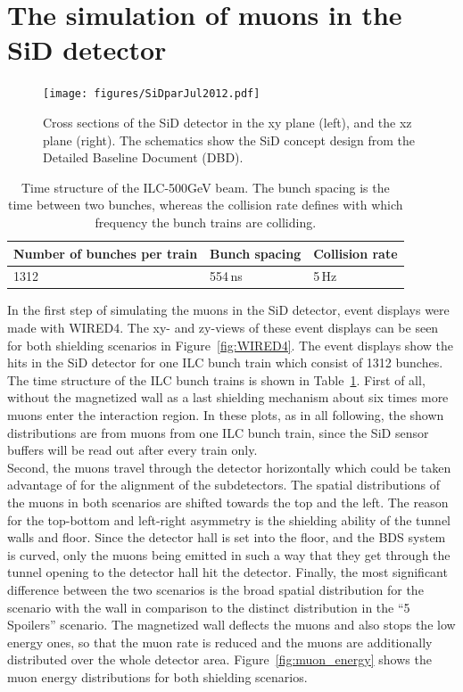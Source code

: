 \section{The simulation of muons in the SiD detector}
\label{Detector}

\begin{figure}
    \centering
    \texttt{[image: figures/SiDparJul2012.pdf]}
    \caption[SiD detector cross sections]{
    Cross sections of the SiD detector in the xy plane (left), and the xz plane (right).
    The schematics show the SiD concept design from the Detailed Baseline Document (DBD).
    }
    \label{fig:SiD}
\end{figure}

\begin{table}
\caption[Time structure of the ILC-500GeV beam.]{Time structure of the ILC-500GeV beam. The bunch spacing is the time between two bunches, whereas the collision rate defines with which frequency the bunch trains are colliding.}
\label{tab:Beam_TimeStructure}
\begin{tabular}{lll}
\hline\hline
\textbf{Number of bunches per train} & \textbf{Bunch spacing} &  \textbf{Collision rate} \tabularnewline
\hline
1312 & \unit{554}\,{ns} & \unit{5}\,{Hz}\tabularnewline
\hline\hline
\end{tabular}
\end{table}

In the first step of simulating the muons in the SiD detector, event displays were made with WIRED4\cite{Wired4}.
The xy- and zy-views of these event displays can be seen for both shielding scenarios in Figure~\ref{fig:WIRED4}.
The event displays show the hits in the SiD detector for one ILC bunch train which consist of 1312 bunches.
The time structure of the ILC bunch trains is shown in Table~\ref{tab:Beam_TimeStructure}.
First of all, without the magnetized wall as a last shielding mechanism about six times more muons enter the interaction region.
In these plots, as in all following, the shown distributions are from muons from one ILC bunch train, since the SiD sensor buffers will be read out after every train only.\\
Second, the muons travel through the detector horizontally which could be taken advantage of for the alignment of the subdetectors.
The spatial distributions of the muons in both scenarios are shifted towards the top and the left.
The reason for the top-bottom and left-right asymmetry is the shielding ability of the tunnel walls and floor.
Since the detector hall is set into the floor, and the BDS system is curved, only the muons being emitted in such a way that they get through the tunnel opening to the detector hall hit the detector.
Finally, the most significant difference between the two scenarios is the broad spatial distribution for the scenario with the wall in comparison to the distinct distribution in the ``5 Spoilers'' scenario.
The magnetized wall deflects the muons and also stops the low energy ones, so that the muon rate is reduced and the muons are additionally distributed over the whole detector area.
Figure~\ref{fig:muon_energy} shows the muon energy distributions for both shielding scenarios.


